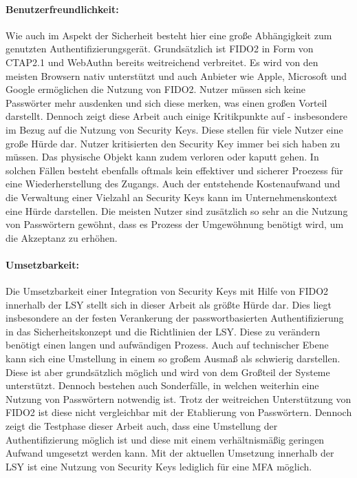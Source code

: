 \paragraph*{Benutzerfreundlichkeit:} Wie auch im Aspekt der Sicherheit besteht hier eine große Abhängigkeit zum genutzten Authentifizierungsgerät. Grundsätzlich ist FIDO2 in Form von CTAP2.1 und WebAuthn bereits weitreichend verbreitet. Es wird von den meisten Browsern nativ unterstützt und auch Anbieter wie Apple, Microsoft und Google ermöglichen die Nutzung von FIDO2. Nutzer müssen sich keine Passwörter mehr ausdenken und sich diese merken, was einen großen Vorteil darstellt. Dennoch zeigt diese Arbeit auch einige Kritikpunkte auf - insbesondere im Bezug auf die Nutzung von Security Keys. Diese stellen für viele Nutzer eine große Hürde dar. Nutzer kritisierten den Security Key immer bei sich haben zu müssen. Das physische Objekt kann zudem verloren oder kaputt gehen. In solchen Fällen besteht ebenfalls oftmals kein effektiver und sicherer Proezess für eine Wiederherstellung des Zugangs. Auch der entstehende Kostenaufwand und die Verwaltung einer Vielzahl an Security Keys kann im Unternehmenskontext eine Hürde darstellen. Die meisten Nutzer sind zusätzlich so sehr an die Nutzung von Passwörtern gewöhnt, dass es Prozess der Umgewöhnung benötigt wird, um die Akzeptanz zu erhöhen.

\paragraph*{Umsetzbarkeit:} Die Umsetzbarkeit einer Integration von Security Keys mit Hilfe von FIDO2 innerhalb der \ac{LSY} stellt sich in dieser Arbeit als größte Hürde dar. Dies liegt insbesondere an der festen Verankerung der passwortbasierten Authentifizierung in das Sicherheitskonzept und die Richtlinien der \ac{LSY}. Diese zu verändern benötigt einen langen und aufwändigen Prozess. Auch auf technischer Ebene kann sich eine Umstellung in einem so großem Ausmaß als schwierig darstellen. Diese ist aber grundsätzlich möglich und wird von dem Großteil der Systeme unterstützt. Dennoch bestehen auch Sonderfälle, in welchen weiterhin eine Nutzung von Passwörtern notwendig ist. Trotz der weitreichen Unterstützung von FIDO2 ist diese nicht vergleichbar mit der Etablierung von Passwörtern. Dennoch zeigt die Testphase dieser Arbeit auch, dass eine Umstellung der Authentifizierung möglich ist und diese mit einem verhältnismäßig geringen Aufwand umgesetzt werden kann. Mit der aktuellen Umsetzung innerhalb der \ac{LSY} ist eine Nutzung von Security Keys lediglich für eine \ac{MFA} möglich. 

